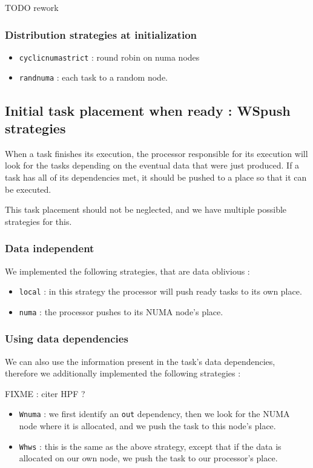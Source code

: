 \documentclass{Styles/llncs}
\begin{document}
TODO rework
\subsubsection{Distribution strategies at initialization}
\begin{itemize}
  \item \verb/cyclicnumastrict/ : round robin on numa nodes
  \item \verb/randnuma/ : each task to a random node.
\end{itemize}

\subsection{Initial task placement when ready : WSpush strategies}

When a task finishes its execution, the processor responsible for its execution
will look for the tasks depending on the eventual data that were just produced.
If a task has all of its dependencies met, it should be pushed to a place
so that it can be executed.

This task placement should not be neglected, and we have multiple possible
strategies for this.

\subsubsection{Data independent}

We implemented the following strategies, that are data oblivious :
\begin{itemize}
  \item \verb/local/ : in this strategy the processor will push ready tasks to
    its own place.
  \item \verb/numa/ : the processor pushes to its NUMA node's place.
\end{itemize}

\subsubsection{Using data dependencies}

We can also use the information present in the task's data dependencies,
therefore we additionally implemented the following strategies :

FIXME : citer HPF ?

\begin{itemize}
  \item \verb/Wnuma/ : we first identify an \verb/out/ dependency, then we
    look for the NUMA node where it is allocated, and we push the task to this
    node's place.
  \item \verb/Whws/ : this is the same as the above strategy, except that if
    the data is allocated on our own node, we push the task to our processor's place.
\end{itemize}
\end{document}
